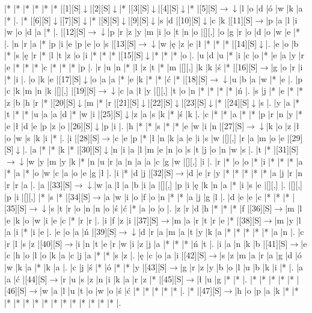 \documentclass[11pt]{article}
\newcommand\drarr{$\rightarrow \!\!\!\!\! \downarrow$}
\newcommand\rarr{$\rightarrow$}
\newcommand\darr{$\downarrow$}
\begin{document}
\noindent\begin{Puzzle}{20}{30}|*	|*	|*	|*	|*	|*	|[1][S]\darr	|[2][S]\darr	|*	|[3][S]\darr	|[4][S]\darr	|*	|[5][S]\drarr	|l	|o	|d	|ó	|w	|k	|a	|*	|.
|*	|[6][S]\darr	|[7][S]\darr	|*	|[8][S]\darr	|[9][S]\darr	|s	|d	|[10][S]\darr	|c	|k	|[11][S]\rarr	|p	|a	|l	|i	|w	|o	|d	|a	|*	|.
|[12][S]\drarr	|p	|r	|z	|y	|m	|i	|o	|t	|n	|o	|[][,]{ }	|o	|g	|r	|o	|d	|o	|w	|e	|*	|.
|n	|r	|a	|*	|p	|i	|e	|p	|e	|o	|s	|[13][S]\drarr	|w	|ę	|z	|e	|ł	|*	|*	|*	|[14][S]\darr	|.
|e	|o	|b	|*	|s	|ę	|r	|*	|l	|t	|z	|o	|i	|*	|*	|*	|[15][S]\darr	|*	|*	|*	|o	|.
|u	|d	|u	|*	|i	|c	|o	|*	|e	|a	|y	|r	|e	|*	|*	|*	|c	|*	|*	|*	|p	|.
|r	|u	|n	|*	|l	|z	|t	|*	|m	|[][,]{ }	|k	|k	|ś	|*	|[16][S]\rarr	|g	|o	|r	|i	|*	|i	|.
|o	|k	|e	|[17][S]\darr	|o	|a	|a	|*	|e	|k	|*	|*	|ć	|*	|[18][S]\drarr	|u	|b	|a	|w	|*	|e	|.
|p	|c	|k	|m	|n	|k	|[][,]{ }	|[19][S]\drarr	|c	|a	|ł	|y	|[][,]{ }	|t	|o	|n	|*	|*	|*	|*	|ń	|.
|s	|j	|*	|e	|*	|*	|z	|b	|h	|r	|*	|[20][S]\darr	|m	|*	|r	|[21][S]\darr	|[22][S]\darr	|[23][S]\darr	|*	|[24][S]\darr	|s	|.
|y	|a	|*	|t	|*	|*	|u	|a	|a	|d	|*	|w	|i	|[25][S]\darr	|z	|a	|s	|k	|*	|ś	|k	|.
|c	|*	|*	|a	|*	|*	|p	|r	|n	|y	|*	|e	|ł	|d	|e	|p	|z	|o	|[26][S]\darr	|p	|i	|.
|h	|*	|*	|s	|*	|*	|e	|w	|i	|n	|[27][S]\drarr	|k	|o	|z	|ł	|o	|w	|s	|k	|i	|*	|.
|i	|[28][S]\rarr	|c	|e	|p	|*	|ł	|n	|k	|a	|e	|i	|s	|w	|[][,]{ }	|r	|a	|m	|o	|e	|[29][S]\darr	|.
|a	|*	|*	|k	|*	|[30][S]\darr	|n	|i	|a	|l	|m	|e	|n	|o	|s	|t	|j	|o	|n	|w	|s	|.
|t	|*	|[31][S]\drarr	|w	|y	|m	|y	|k	|*	|n	|u	|r	|a	|n	|a	|a	|c	|g	|w	|[][,]{ }	|i	|.
|r	|*	|o	|o	|*	|i	|*	|*	|*	|a	|*	|a	|*	|o	|w	|c	|a	|o	|e	|g	|ł	|.
|i	|*	|d	|j	|[32][S]\rarr	|d	|e	|r	|y	|*	|*	|*	|*	|*	|a	|j	|r	|n	|r	|r	|a	|.
|a	|[33][S]\drarr	|w	|a	|l	|a	|b	|i	|a	|[][,]{ }	|p	|i	|ę	|k	|n	|a	|*	|i	|s	|e	|[][,]{ }	|.
|[][,]{ }	|p	|i	|[][,]{ }	|*	|s	|*	|[34][S]\rarr	|a	|w	|i	|o	|f	|o	|n	|*	|*	|a	|j	|g	|l	|.
|d	|e	|e	|c	|*	|*	|*	|[35][S]\drarr	|s	|t	|r	|o	|n	|n	|o	|ś	|ć	|*	|a	|o	|o	|.
|z	|r	|d	|h	|*	|*	|*	|f	|[36][S]\rarr	|m	|l	|e	|k	|o	|w	|i	|e	|c	|*	|r	|r	|.
|i	|f	|z	|i	|[37][S]\rarr	|m	|a	|r	|t	|r	|e	|*	|[38][S]\rarr	|m	|y	|l	|a	|i	|*	|i	|e	|.
|e	|o	|a	|ń	|[39][S]\drarr	|d	|r	|a	|m	|a	|t	|y	|k	|a	|*	|*	|*	|*	|*	|a	|n	|.
|c	|r	|l	|s	|z	|[40][S]\rarr	|i	|n	|t	|e	|r	|w	|i	|z	|j	|a	|*	|*	|*	|ń	|t	|.
|i	|a	|n	|k	|b	|[41][S]\rarr	|e	|c	|h	|o	|l	|o	|k	|a	|c	|j	|a	|*	|*	|s	|z	|.
|ę	|c	|o	|a	|i	|[42][S]\rarr	|s	|z	|m	|a	|r	|a	|g	|d	|ó	|w	|k	|a	|*	|k	|a	|.
|c	|j	|ś	|*	|ó	|*	|*	|y	|[43][S]\rarr	|g	|r	|z	|y	|b	|o	|l	|u	|b	|k	|i	|*	|.
|a	|a	|ć	|[44][S]\rarr	|r	|u	|s	|z	|n	|i	|k	|a	|r	|z	|*	|[45][S]\rarr	|ł	|u	|g	|*	|*	|.
|*	|*	|*	|*	|*	|[46][S]\rarr	|w	|a	|l	|u	|t	|o	|w	|o	|ś	|ć	|*	|*	|*	|*	|*	|.
|*	|[47][S]\rarr	|h	|o	|p	|a	|k	|*	|*	|*	|*	|*	|*	|*	|*	|*	|*	|*	|*	|*	|*	|.\end{Puzzle}
\end{document}
